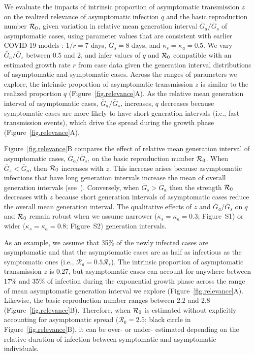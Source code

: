 We evaluate the impacts of intrinsic proportion of asymptomatic transmission $z$ on the realized relevance of asymptomatic infection $q$ and the basic reproduction number ${\cal{R}}_0$, given variation in relative mean generation interval $\bar G_a/\bar G_s$ of asymptomatic cases, using parameter values that are consistent with earlier COVID-19 models \citep{park_preprint}: $1/r=7$ days, $\bar G_s=8$ days, and $\kappa_s=\kappa_a=0.5$.
We vary $\bar G_a/\bar G_s$ between 0.5 and 2, and infer values of $q$ and ${\cal{R}}_0$ compatible with an estimated growth rate $r$ from case data given the generation interval distributions of asymptomatic and symptomatic cases.
Across the ranges of parameters we explore, the intrinsic proportion of asymptomatic transmission $z$ is similar to the realized proportion $q$ (Figure~\ref{fig.relevance}A).
As the relative mean generation interval of asymptomatic cases, $\bar G_a/\bar G_s$, increases, $q$ decreases because symptomatic cases are more likely to have short generation intervals (i.e., fast transmission events), which drive the spread during the growth phase (Figure~\ref{fig.relevance}A).

Figure~\ref{fig.relevance}B compares the effect of relative mean generation interval of asymptomatic cases, $\bar G_a/\bar G_s$, on the basic reproduction number ${\cal{R}}_0$.
When $\bar G_s < \bar G_a$, then ${\cal{R}}_0$ increases with $z$.
This increase arises because asymptomatic infections that have long generation intervals increase the mean of overall generation intervals (see~\citep{park_2019practical}).
Conversely, when $\bar G_s > \bar G_a$ then the strength ${\cal{R}}_0$ decreases with $z$ because short generation intervals of asymptomatic cases reduce the overall mean generation interval.
The qualitative effects of $z$ and $\bar G_a/\bar G_s$ on $q$ and ${\cal{R}}_0$ remain robust when we assume narrower ($\kappa_s = \kappa_a = 0.3$; Figure~S1) or wider ($\kappa_s = \kappa_a = 0.8$; Figure~S2) generation intervals.

As an example, we assume that 35\% of the newly infected cases are asymptomatic \citep{mizumoto_2020} and that the asymptomatic cases are as half as infectious as the symptomatic ones (i.e., $\mathcal R_a = 0.5 \mathcal R_s$).
The intrinsic proportion of asymptomatic transmission $z$ is 0.27, but asymptomatic cases can account for anywhere between 17\% and 35\% of infection during the exponential growth phase across the range of mean asymptomatic generation interval we explore (Figure~\ref{fig.relevance}A).
Likewise, the basic reproduction number ranges between 2.2 and 2.8 (Figure~\ref{fig.relevance}B).
Therefore, when ${\cal{R}}_0$ is estimated without explicitly accounting for asymptomatic spread ($\mathcal R_0=2.5$; black circle in Figure~\ref{fig.relevance}B), it can be over- or under- estimated depending on the relative duration of infection between symptomatic and asymptomatic individuals.


